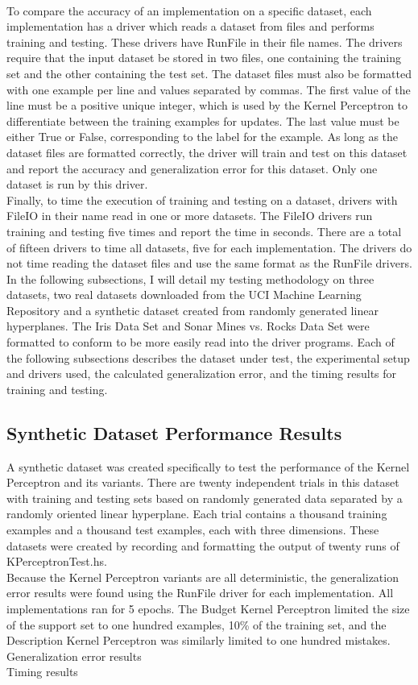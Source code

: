 \\To compare the accuracy of an implementation on a specific dataset, each implementation has a driver which reads a dataset from files and performs training and testing. These drivers have RunFile in their file names. The drivers require that the input dataset be stored in two files, one containing the training set and the other containing the test set. The dataset files must also be formatted with one example per line and values separated by commas. The first value of the line must be a positive unique integer, which is used by the Kernel Perceptron to differentiate between the training examples for updates. The last value must be either True or False, corresponding to the label for the example. As long as the dataset files are formatted correctly, the driver will train and test on this dataset and report the accuracy and generalization error for this dataset. Only one dataset is run by this driver.
\\Finally, to time the execution of training and testing on a dataset, drivers with FileIO in their name read in one or more datasets. The FileIO drivers run training and testing five times and report the time in seconds. There are a total of fifteen drivers to time all datasets, five for each implementation. The drivers do not time reading the dataset files and use the same format as the RunFile drivers. 
\\In the following subsections, I will detail my testing methodology on three datasets, two real datasets downloaded from the UCI Machine Learning Repository \cite{DG17} and a synthetic dataset created from randomly generated linear hyperplanes. The Iris Data Set \cite{Fis36} and Sonar Mines vs. Rocks Data Set \cite{SG88} were formatted to conform to be more easily read into the driver programs. Each of the following subsections describes the dataset under test, the experimental setup and drivers used, the calculated generalization error, and the timing results for training and testing.
\subsection{Synthetic Dataset Performance Results}\label{SyntheticResults}
A synthetic dataset was created specifically to test the performance of the Kernel Perceptron and its variants. There are twenty independent trials in this dataset with training and testing sets based on randomly generated data separated by a randomly oriented linear hyperplane. Each trial contains a thousand training examples and a thousand test examples, each with three dimensions. These datasets were created by recording and formatting the output of twenty runs of KPerceptronTest.hs. 
\\Because the Kernel Perceptron variants are all deterministic, the generalization error results were found using the RunFile driver for each implementation. All implementations ran for 5 epochs. The Budget Kernel Perceptron limited the size of the support set to one hundred examples, 10\% of the training set, and the Description Kernel Perceptron was similarly limited to one hundred mistakes. 
\\Generalization error results
\\Timing results
